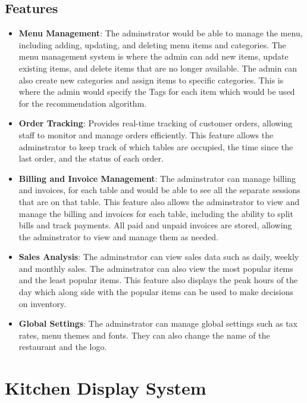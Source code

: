 \subsection{Features}
\begin{itemize}
    \item \textbf{Menu Management}: The adminstrator would be able to manage the menu, including adding, updating, and deleting menu items and categories. The menu management system is where the admin can add new items, update existing items, and delete items that are no longer available. The admin can also create new categories and assign items to specific categories. This is where the admin would specify the Tags for each item which would be used for the recommendation algorithm.
    \item \textbf{Order Tracking}: Provides real-time tracking of customer orders, allowing staff to monitor and manage orders efficiently. This feature allows the adminstrator to keep track of which tables are occupied, the time since the last order, and the status of each order.
    \item \textbf{Billing and Invoice Management}: The adminstrator can manage billing and invoices, for each table and would be able to see all the separate sessions that are on that table. This feature also allows the adminstrator to view and manage the billing and invoices for each table, including the ability to split bills and track payments. All paid and unpaid invoices are stored, allowing the adminstrator to view and manage them as needed.
    \item \textbf{Sales Analysis}: The adminstrator can view sales data such as daily, weekly and monthly sales. The adminstrator can also view the most popular items and the least popular items. This feature also displays the peak hours of the day which along side with the popular items can be used to make decisions on inventory.
    \item \textbf{Global Settings}: The adminstrator can manage global settings such as tax rates, menu themes and fonts. They can also change the name of the restaurant and the logo.
\end{itemize}

\section{Kitchen Display System}

